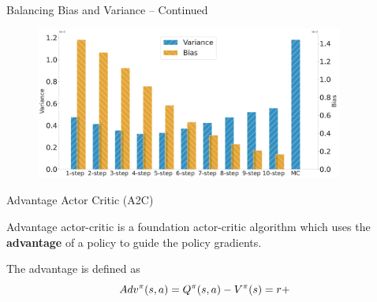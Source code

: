 \begin{frame}[t]{Balancing Bias and Variance -- Continued}
    \begin{figure}
        \centering
        \includegraphics[width=0.9\textwidth]{images/chapter_8/a2c_lbf_nstep_comparison.pdf}
    \end{figure}
\end{frame}

\begin{frame}[t]{Advantage Actor Critic (A2C)}

Advantage actor-critic is a foundation actor-critic algorithm which uses the \textbf{advantage} of a policy to guide the policy gradients.

\blist
    \item The advantage is defined as
\elist
\vspace{0pt}
\[
    Adv^{\pi}(s, a) = Q^{\pi}(s, a) - V^{\pi}(s) = r + 
\]

\end{frame}


